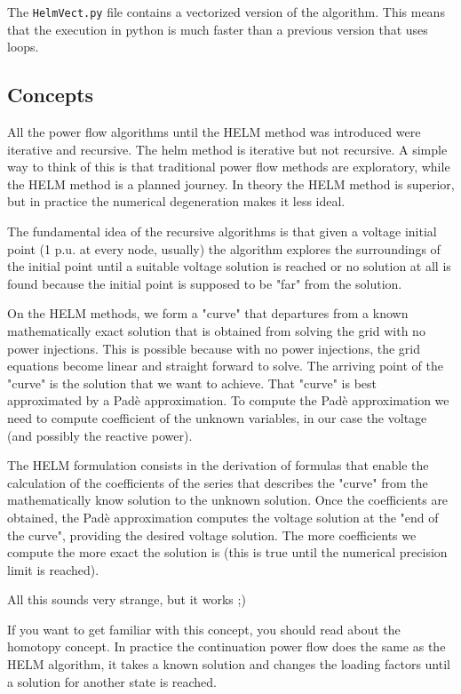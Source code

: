 \documentclass[11pt,fleqn]{book} %
\begin{document}
The \verb|HelmVect.py|  file contains a vectorized version of the algorithm. This means that the execution in python is much faster than a previous version that uses loops.

\subsection{Concepts}

All the power flow algorithms until the HELM method was introduced were iterative and recursive. The helm method is iterative but not recursive. A simple way to think of this is that traditional power flow methods are exploratory, while the HELM method is a planned journey. In theory the HELM method is superior, but in practice the numerical degeneration makes it less ideal.

The fundamental idea of the recursive algorithms is that given a voltage initial point (1 p.u. at every node, usually) the algorithm explores the surroundings of the initial point until a suitable voltage solution is reached or no solution at all is found because the initial point is supposed to be "far" from the solution.

On the HELM methods, we form a "curve" that departures from a known mathematically exact solution that is obtained from solving the grid with no power injections. This is possible because with no power injections, the grid equations become linear and straight forward to solve. The arriving point of the "curve" is the solution that we want to achieve. That "curve" is best approximated by a Padè approximation. To compute the Padè approximation we need to compute coefficient of the unknown variables, in our case the voltage (and possibly the reactive power).

The HELM formulation consists in the derivation of formulas that enable the calculation of the coefficients of the series that describes the "curve" from the mathematically know solution to the unknown solution. Once the coefficients are obtained, the Padè approximation computes the voltage solution at the "end of the curve", providing the desired voltage solution. The more coefficients we compute the more exact the solution is (this is true until the numerical precision limit is reached).\newline 


All this sounds very strange, but it works ;)\newline 


If you want to get familiar with this concept, you should read about the homotopy concept. In practice the continuation power flow does the same as the HELM algorithm, it takes a known solution and changes the loading factors until a solution for another state is reached.
\end{document}
